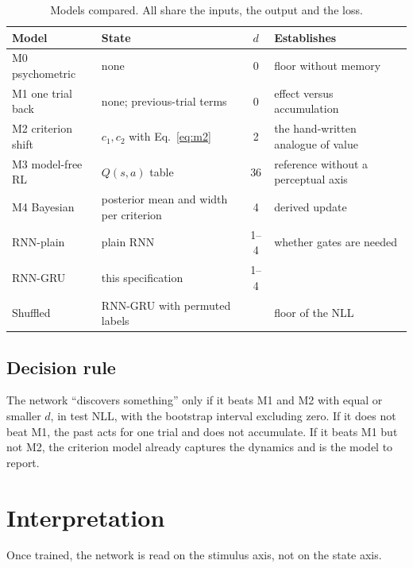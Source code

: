 \documentclass[11pt,a4paper]{article}
\begin{document}
\begin{table}[H]
  \centering\small
  \caption{Models compared. All share the inputs, the output and the loss.}
  \label{tab:models}
  \begin{tabular}{lp{5.2cm}cp{5cm}}
    \toprule
    Model & State & $d$ & Establishes \\
    \midrule
    M0 psychometric & none & 0 & floor without memory \\
    M1 one trial back & none; previous-trial terms & 0 & effect versus accumulation \\
    M2 criterion shift & $c_1, c_2$ with Eq.~\eqref{eq:m2} & 2 & the hand-written analogue of value \\
    M3 model-free RL & $Q(s,a)$ table & 36 & reference without a perceptual axis \\
    M4 Bayesian & posterior mean and width per criterion & 4 & derived update \\
    RNN-plain & plain RNN & 1--4 & whether gates are needed \\
    RNN-GRU & this specification & 1--4 & \\
    Shuffled & RNN-GRU with permuted labels & & floor of the NLL \\
    \bottomrule
  \end{tabular}
\end{table}

\subsection{Decision rule}

The network ``discovers something'' only if it beats M1 and M2 with equal or smaller
$d$, in test NLL, with the bootstrap interval excluding zero. If it does not beat M1,
the past acts for one trial and does not accumulate. If it beats M1 but not M2, the
criterion model already captures the dynamics and is the model to report.

\section{Interpretation}
\label{sec:interp}

Once trained, the network is read on the stimulus axis, not on the state axis.
\end{document}
